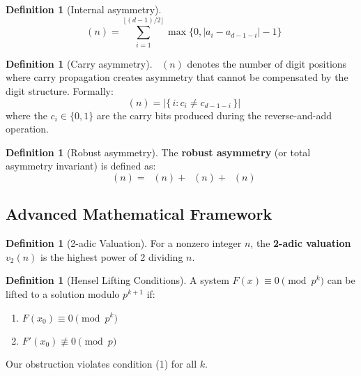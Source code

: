 \documentclass[11pt,a4paper]{article}
\theoremstyle{plain}
\theoremstyle{definition}
\newtheorem{definition}[theorem]{Definition}
\DeclareMathOperator{\Aext}{A^{\text{(ext)}}}
\DeclareMathOperator{\Aint}{A^{\text{(int)}}}
\DeclareMathOperator{\Acarry}{A^{\text{(carry)}}}
\DeclareMathOperator{\Arobust}{A^{\text{(robust)}}}
\begin{document}
\begin{definition}[Internal asymmetry]
\begin{equation}
\Aint(n) = \sum_{i=1}^{\lfloor (d-1)/2 \rfloor} \max\{0, |a_i - a_{d-1-i}| - 1\}
\end{equation}
\end{definition}

\begin{definition}[Carry asymmetry]
$\Acarry(n)$ denotes the number of digit positions where carry propagation
creates asymmetry that cannot be compensated by the digit structure.
Formally:
\[
\Acarry(n) = \big|\{\,i : c_i \neq c_{d-1-i}\,\}\big|
\]
where the $c_i\in\{0,1\}$ are the carry bits produced during the reverse-and-add operation.
\end{definition}

\begin{definition}[Robust asymmetry]
The \textbf{robust asymmetry} (or total asymmetry invariant) is defined as:
\begin{equation}
\Arobust(n) = \Aext(n) + \Aint(n) + \Acarry(n)
\end{equation}
\end{definition}

\subsection{Advanced Mathematical Framework}

\begin{definition}[2-adic Valuation]
For a nonzero integer $n$, the \textbf{2-adic valuation} $v_2(n)$ is the highest power of 2 dividing $n$.
\end{definition}

\begin{definition}[Hensel Lifting Conditions]
A system $F(x) \equiv 0 \pmod{p^k}$ can be lifted to a solution modulo $p^{k+1}$ if:
\begin{enumerate}
\item $F(x_0) \equiv 0 \pmod{p^k}$
\item $F'(x_0) \not\equiv 0 \pmod{p}$
\end{enumerate}
Our obstruction violates condition (1) for all $k$.
\end{definition}


\end{document}
